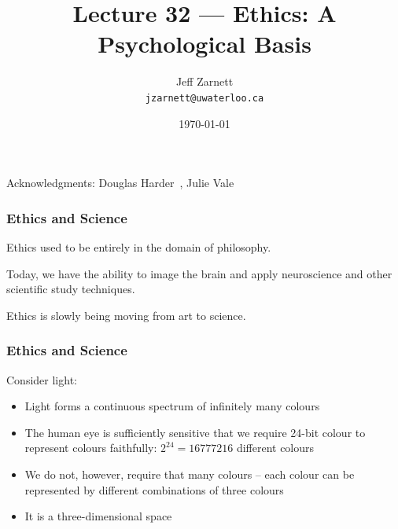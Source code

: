 

\title{Lecture 32 --- Ethics: A Psychological Basis }

\author{Jeff Zarnett \\ \small \texttt{jzarnett@uwaterloo.ca}}
\date{\today}




\begin{frame}
  \titlepage

\begin{center}
  \small{Acknowledgments: Douglas Harder~\cite{dwh}, Julie Vale~\cite{jv}}
  \end{center}
\end{frame}




\begin{frame}
\frametitle{Ethics and Science}

Ethics used to be entirely in the domain of philosophy.

Today, we have the ability to image the brain and apply neuroscience and other scientific study techniques. 

Ethics is slowly being moving from art to science.

\end{frame}



\begin{frame}
\frametitle{Ethics and Science}

Consider light:
\begin{itemize}
\item Light forms a continuous spectrum of infinitely many colours
\item The human eye is sufficiently sensitive that we require 24-bit colour to represent colours faithfully:  $2^{24} = 16 777 216$ different colours
\item We do not, however, require that many colours -- each colour can be represented by different combinations of three colours
\item It is a three-dimensional space
\end{itemize}


\end{frame}



